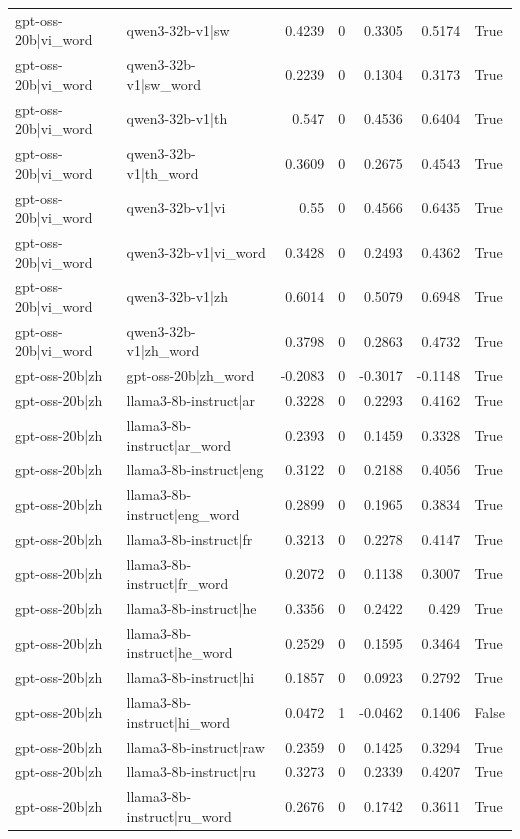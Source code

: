 \begin{table}
\begin{tabular}{l l r r r r l}
gpt-oss-20b|vi_word & qwen3-32b-v1|sw & 0.4239 & 0 & 0.3305 & 0.5174 & True \\
gpt-oss-20b|vi_word & qwen3-32b-v1|sw_word & 0.2239 & 0 & 0.1304 & 0.3173 & True \\
gpt-oss-20b|vi_word & qwen3-32b-v1|th & 0.547 & 0 & 0.4536 & 0.6404 & True \\
gpt-oss-20b|vi_word & qwen3-32b-v1|th_word & 0.3609 & 0 & 0.2675 & 0.4543 & True \\
gpt-oss-20b|vi_word & qwen3-32b-v1|vi & 0.55 & 0 & 0.4566 & 0.6435 & True \\
gpt-oss-20b|vi_word & qwen3-32b-v1|vi_word & 0.3428 & 0 & 0.2493 & 0.4362 & True \\
gpt-oss-20b|vi_word & qwen3-32b-v1|zh & 0.6014 & 0 & 0.5079 & 0.6948 & True \\
gpt-oss-20b|vi_word & qwen3-32b-v1|zh_word & 0.3798 & 0 & 0.2863 & 0.4732 & True \\
gpt-oss-20b|zh & gpt-oss-20b|zh_word & -0.2083 & 0 & -0.3017 & -0.1148 & True \\
gpt-oss-20b|zh & llama3-8b-instruct|ar & 0.3228 & 0 & 0.2293 & 0.4162 & True \\
gpt-oss-20b|zh & llama3-8b-instruct|ar_word & 0.2393 & 0 & 0.1459 & 0.3328 & True \\
gpt-oss-20b|zh & llama3-8b-instruct|eng & 0.3122 & 0 & 0.2188 & 0.4056 & True \\
gpt-oss-20b|zh & llama3-8b-instruct|eng_word & 0.2899 & 0 & 0.1965 & 0.3834 & True \\
gpt-oss-20b|zh & llama3-8b-instruct|fr & 0.3213 & 0 & 0.2278 & 0.4147 & True \\
gpt-oss-20b|zh & llama3-8b-instruct|fr_word & 0.2072 & 0 & 0.1138 & 0.3007 & True \\
gpt-oss-20b|zh & llama3-8b-instruct|he & 0.3356 & 0 & 0.2422 & 0.429 & True \\
gpt-oss-20b|zh & llama3-8b-instruct|he_word & 0.2529 & 0 & 0.1595 & 0.3464 & True \\
gpt-oss-20b|zh & llama3-8b-instruct|hi & 0.1857 & 0 & 0.0923 & 0.2792 & True \\
gpt-oss-20b|zh & llama3-8b-instruct|hi_word & 0.0472 & 1 & -0.0462 & 0.1406 & False \\
gpt-oss-20b|zh & llama3-8b-instruct|raw & 0.2359 & 0 & 0.1425 & 0.3294 & True \\
gpt-oss-20b|zh & llama3-8b-instruct|ru & 0.3273 & 0 & 0.2339 & 0.4207 & True \\
gpt-oss-20b|zh & llama3-8b-instruct|ru_word & 0.2676 & 0 & 0.1742 & 0.3611 & True \\

\end{tabular}
\end{table}
